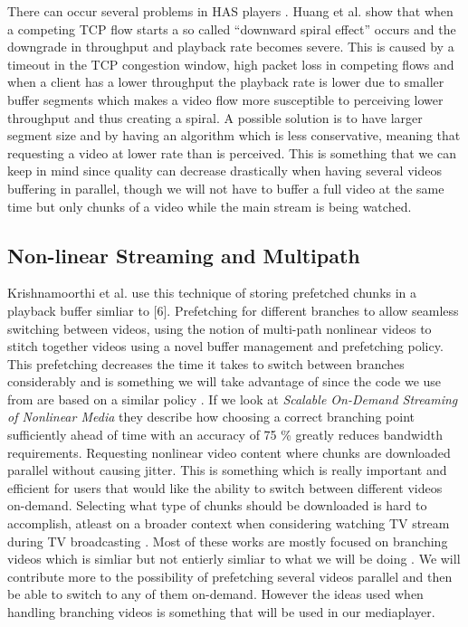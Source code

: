 \documentclass[9pt,a4paper]{acmproc}
\begin{document}
There can occur several problems in HAS players \cite{qualbranch}. Huang et al. \cite{streamrate} show that when a competing TCP flow starts a so called “downward spiral effect” occurs and the downgrade in throughput and playback rate becomes severe. This is caused by a timeout in the TCP congestion window, high packet loss in competing flows and when a client has a lower throughput the playback rate is lower due to smaller buffer segments which makes a video flow more susceptible to perceiving lower throughput and thus creating a spiral. A possible solution is to have larger segment size and by having an algorithm which is less conservative, meaning that requesting a video at lower rate than is perceived. This is something that we can keep in mind since quality can decrease drastically when having several videos buffering in parallel, though we will not have to buffer a full video at the same time but only chunks of a video while the main stream is being watched.

\subsection{Non-linear Streaming and Multipath}
Krishnamoorthi et al. \cite{hasmultipath} use this technique of storing prefetched chunks in a playback buffer simliar to [6]. Prefetching for different branches to allow seamless switching between videos, using the notion of multi-path nonlinear videos to stitch together videos using a novel buffer management and prefetching policy. This prefetching decreases the time it takes to switch between branches considerably and is something we will take advantage of since the code we use from \cite{qualbranch} are based on a similar policy \cite{hasmultipath}. If we look at \textit{Scalable On-Demand Streaming of 
Nonlinear Media} they describe how choosing a correct branching point sufficiently ahead of time with an accuracy of 75 \% greatly reduces bandwidth requirements. Requesting nonlinear video content where chunks are downloaded parallel without causing jitter. This is something which is really important and efficient for users that would like the ability to switch between different videos on-demand. Selecting what type of chunks should be downloaded is hard to accomplish, atleast on a broader context when considering watching TV stream during TV broadcasting \cite{scalableOnDemand}.  Most of these works are mostly focused on branching videos which is simliar but not entierly simliar to what we will be doing \cite{qualbranch, hasmultipath,scalableOnDemand}. We will contribute more to the possibility of prefetching several videos parallel and then be able to switch to any of  them on-demand. However the ideas used when handling branching videos is something that will be used in our mediaplayer.
\end{document}
